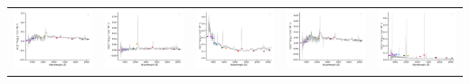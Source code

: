\begin{center}
\begin{longtable}{l l l l l }
    \includegraphics[width=0.2\linewidth, clip]{Figs/Figs-sdss/spec-4377-55828-0912-SPLUS-s02s07-022389.pdf} & \includegraphics[width=0.2\linewidth, clip]{Figs/Figs-sdss/spec-4380-55857-0774-SPLUS-s02s10-002532.pdf} & \includegraphics[width=0.2\linewidth, clip]{Figs/Figs-sdss/spec-4740-55651-0188-SPLUS-n02n18-039610.pdf} & \includegraphics[width=0.2\linewidth, clip]{Figs/Figs-sdss/spec-4778-55706-0848-SPLUS-n05n55-008444.pdf} & \includegraphics[width=0.2\linewidth, clip]{Figs/Figs-sdss/spec-4781-55653-0846-SPLUS-n05n50-021799.pdf} \\

\end{longtable}
\end{center}
